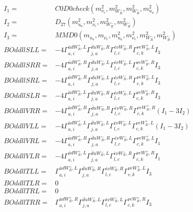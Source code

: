\documentclass[A4,landscape]{article}
\begin{document}
\begin{align} 
I_1 = & C0D0check(m^2_{\nu_{{c}}}, m^2_{W_R^-}, m^2_{W_R^-}, m^2_{u_{{a}}}) \\ 
I_2 = & D_{27}(m^2_{u_{{a}}}, m^2_{\nu_{{c}}}, m^2_{W_R^-}, m^2_{W_R^-}) \\ 
I_3 = & MMD0(m_{u_{{a}}}, m_{\nu_{{c}}}, m^2_{u_{{a}}}, m^2_{\nu_{{c}}}, m^2_{W_R^-}, m^2_{W_R^-}) \\ 
  BOddllSLL= & -4  \Gamma^{\bar{u}d W_R^+,L}_{a, i} \Gamma^{\bar{d}u W_R^- ,R}_{j, a} \Gamma^{\bar{e}\nu W_R^- ,R}_{l, c} \Gamma^{\nu e W_R^+,L}_{c, k} I_3 \\ 
  BOddllSRR= & -4  \Gamma^{\bar{u}d W_R^+,R}_{a, i} \Gamma^{\bar{d}u W_R^- ,L}_{j, a} \Gamma^{\bar{e}\nu W_R^- ,L}_{l, c} \Gamma^{\nu e W_R^+,R}_{c, k} I_3 \\ 
  BOddllSRL= & -4  \Gamma^{\bar{u}d W_R^+,R}_{a, i} \Gamma^{\bar{d}u W_R^- ,L}_{j, a} \Gamma^{\bar{e}\nu W_R^- ,R}_{l, c} \Gamma^{\nu e W_R^+,L}_{c, k} I_3 \\ 
  BOddllSLR= & -4  \Gamma^{\bar{u}d W_R^+,L}_{a, i} \Gamma^{\bar{d}u W_R^- ,R}_{j, a} \Gamma^{\bar{e}\nu W_R^- ,L}_{l, c} \Gamma^{\nu e W_R^+,R}_{c, k} I_3 \\ 
  BOddllVRR= & -4  \Gamma^{\bar{u}d W_R^+,R}_{a, i} \Gamma^{\bar{d}u W_R^- ,R}_{j, a} \Gamma^{\bar{e}\nu W_R^- ,R}_{l, c} \Gamma^{\nu e W_R^+,R}_{c, k} (I_1 - 3 I_2) \\ 
  BOddllVLL= & -4  \Gamma^{\bar{u}d W_R^+,L}_{a, i} \Gamma^{\bar{d}u W_R^- ,L}_{j, a} \Gamma^{\bar{e}\nu W_R^- ,L}_{l, c} \Gamma^{\nu e W_R^+,L}_{c, k} (I_1 - 3 I_2) \\ 
  BOddllVRL= & -4  \Gamma^{\bar{u}d W_R^+,R}_{a, i} \Gamma^{\bar{d}u W_R^- ,R}_{j, a} \Gamma^{\bar{e}\nu W_R^- ,L}_{l, c} \Gamma^{\nu e W_R^+,L}_{c, k} I_1 \\ 
  BOddllVLR= & -4  \Gamma^{\bar{u}d W_R^+,L}_{a, i} \Gamma^{\bar{d}u W_R^- ,L}_{j, a} \Gamma^{\bar{e}\nu W_R^- ,R}_{l, c} \Gamma^{\nu e W_R^+,R}_{c, k} I_1 \\ 
  BOddllTLL= &  \Gamma^{\bar{u}d W_R^+,L}_{a, i} \Gamma^{\bar{d}u W_R^- ,R}_{j, a} \Gamma^{\bar{e}\nu W_R^- ,R}_{l, c} \Gamma^{\nu e W_R^+,L}_{c, k} I_3 \\ 
  BOddllTLR= & 0 \\ 
  BOddllTRL= & 0 \\ 
  BOddllTRR= &  \Gamma^{\bar{u}d W_R^+,R}_{a, i} \Gamma^{\bar{d}u W_R^- ,L}_{j, a} \Gamma^{\bar{e}\nu W_R^- ,L}_{l, c} \Gamma^{\nu e W_R^+,R}_{c, k} I_3 \\ 
\end{align} 
\end{document}
